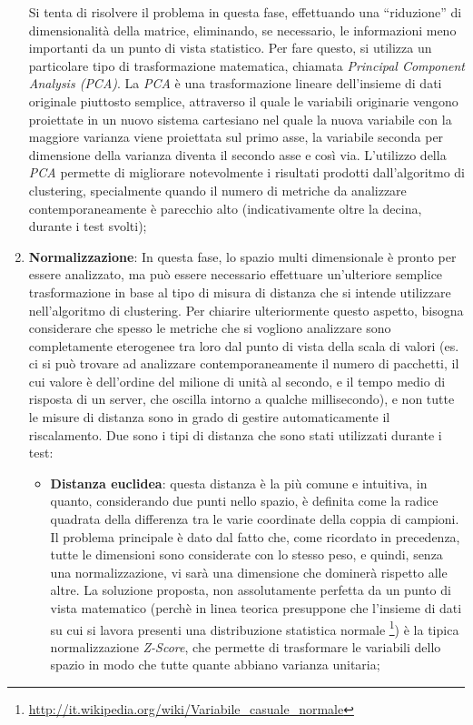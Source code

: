 \documentclass[12pt,a4paper,cucitura]{toptesi}
\begin{document}
\begin{enumerate}
Si tenta di risolvere il problema in questa fase, effettuando una ``riduzione'' di dimensionalità della matrice, eliminando, se necessario, le informazioni meno importanti da un punto di vista statistico.
Per fare questo, si utilizza un particolare tipo di trasformazione matematica, chiamata \emph{Principal Component Analysis (PCA)}. La \emph{PCA} è una trasformazione lineare dell'insieme di dati originale piuttosto semplice, attraverso il quale le variabili originarie vengono proiettate in un nuovo sistema cartesiano nel quale la nuova variabile con la maggiore varianza viene proiettata sul primo asse, la variabile seconda per dimensione della varianza diventa il secondo asse e così via. L'utilizzo della \emph{PCA} permette di migliorare notevolmente i risultati prodotti dall'algoritmo di clustering, specialmente quando il numero di metriche da analizzare contemporaneamente è parecchio alto (indicativamente oltre la decina, durante i test svolti);
\item \textbf{Normalizzazione}: In questa fase, lo spazio multi dimensionale è pronto per essere analizzato, ma può essere necessario effettuare un'ulteriore semplice trasformazione in base al tipo di misura di distanza che si intende utilizzare nell'algoritmo di clustering. Per chiarire ulteriormente questo aspetto, bisogna considerare che spesso le metriche che si vogliono analizzare sono completamente eterogenee tra loro dal punto di vista della scala di valori (es. ci si può trovare ad analizzare contemporaneamente il numero di pacchetti, il cui valore è dell'ordine del milione di unità al secondo, e il tempo medio di risposta di un server, che oscilla intorno a qualche millisecondo), e non tutte le misure di distanza sono in grado di gestire automaticamente il riscalamento. Due sono i tipi di distanza che sono stati utilizzati durante i test:
\begin{itemize}
\item \textbf{Distanza euclidea}: questa distanza è la più comune e intuitiva, in quanto, considerando due punti nello spazio, è definita come la radice quadrata della differenza tra le varie coordinate della coppia di campioni. Il problema principale è dato dal fatto che, come ricordato in precedenza, tutte le dimensioni sono considerate con lo stesso peso, e quindi, senza una normalizzazione, vi sarà una dimensione che dominerà rispetto alle altre. La soluzione proposta, non assolutamente perfetta da un punto di vista matematico (perchè in linea teorica presuppone che l'insieme di dati su cui si lavora presenti una distribuzione statistica normale \footnote{\url{http://it.wikipedia.org/wiki/Variabile_casuale_normale}}) è la tipica normalizzazione \emph{Z-Score}, che permette di trasformare le variabili dello spazio in modo che tutte quante abbiano varianza unitaria;

\end{itemize}
\end{enumerate}
\end{document}
